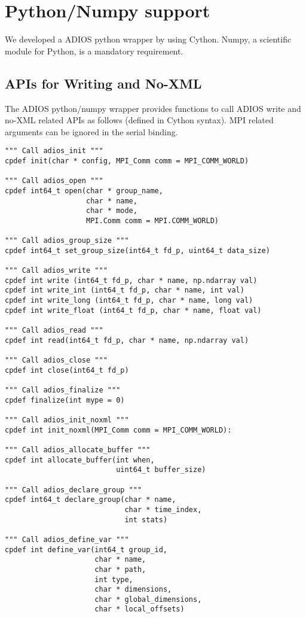 \section{Python/Numpy support}
\label{section-bindings-numpy}
We developed a ADIOS python wrapper by using Cython. Numpy, a scientific module for Python, is a mandatory requirement. 

\subsection{APIs for Writing and No-XML}
The ADIOS python/numpy wrapper provides functions to call ADIOS write and no-XML related APIs as follows (defined in Cython syntax). MPI related arguments can be ignored in the serial binding.
\begin{lstlisting}[language=cython,caption={Functions for writing and No-XML},label={},]
""" Call adios_init """
cpdef init(char * config, MPI_Comm comm = MPI_COMM_WORLD)

""" Call adios_open """
cpdef int64_t open(char * group_name,
                   char * name,
                   char * mode,
                   MPI.Comm comm = MPI.COMM_WORLD)

""" Call adios_group_size """
cpdef int64_t set_group_size(int64_t fd_p, uint64_t data_size)

""" Call adios_write """
cpdef int write (int64_t fd_p, char * name, np.ndarray val)
cpdef int write_int (int64_t fd_p, char * name, int val)
cpdef int write_long (int64_t fd_p, char * name, long val)
cpdef int write_float (int64_t fd_p, char * name, float val)

""" Call adios_read """
cpdef int read(int64_t fd_p, char * name, np.ndarray val)

""" Call adios_close """
cpdef int close(int64_t fd_p)

""" Call adios_finalize """
cpdef finalize(int mype = 0)

""" Call adios_init_noxml """
cpdef int init_noxml(MPI_Comm comm = MPI_COMM_WORLD):

""" Call adios_allocate_buffer """
cpdef int allocate_buffer(int when,
                          uint64_t buffer_size)

""" Call adios_declare_group """
cpdef int64_t declare_group(char * name,
                            char * time_index,
                            int stats)

""" Call adios_define_var """
cpdef int define_var(int64_t group_id,
                     char * name,
                     char * path,
                     int type,
                     char * dimensions,
                     char * global_dimensions,
                     char * local_offsets)


\end{lstlisting}

